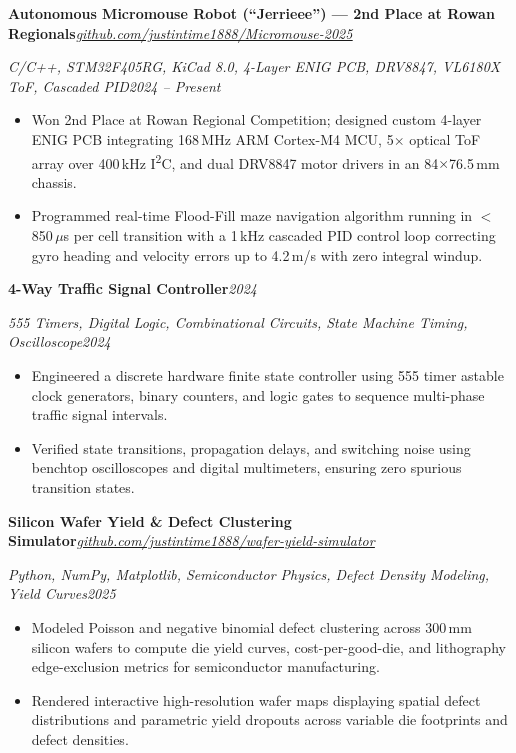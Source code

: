 \documentclass[10pt]{article}
\newcommand{\ulink}[2]{\href{#1}{\underline{#2}}}
\newcommand{\RoleDates}[2]{\noindent\textit{#1}\hfill\textit{#2}\par}
\newcommand{\ProjectHeading}[2]{\noindent\textbf{#1}\hfill\textit{#2}\par}
\begin{document}
\ProjectHeading{Autonomous Micromouse Robot (``Jerrieee'') --- 2nd Place at Rowan Regionals}{\ulink{https://github.com/justintime1888/Micromouse-2025}{github.com/justintime1888/Micromouse-2025}}
\RoleDates{C/C++, STM32F405RG, KiCad 8.0, 4-Layer ENIG PCB, DRV8847, VL6180X ToF, Cascaded PID}{2024 -- Present}
\begin{itemize}
  \item Won 2nd Place at Rowan Regional Competition; designed custom 4-layer ENIG PCB integrating 168\,MHz ARM Cortex-M4 MCU, 5$\times$ optical ToF array over 400\,kHz I\textsuperscript{2}C, and dual DRV8847 motor drivers in an 84$\times$76.5\,mm chassis.
  \item Programmed real-time Flood-Fill maze navigation algorithm running in $<$850\,$\mu$s per cell transition with a 1\,kHz cascaded PID control loop correcting gyro heading and velocity errors up to 4.2\,m/s with zero integral windup.
\end{itemize}

\vspace{3.5pt}
\ProjectHeading{4-Way Traffic Signal Controller}{2024}
\RoleDates{555 Timers, Digital Logic, Combinational Circuits, State Machine Timing, Oscilloscope}{2024}
\begin{itemize}
  \item Engineered a discrete hardware finite state controller using 555 timer astable clock generators, binary counters, and logic gates to sequence multi-phase traffic signal intervals.
  \item Verified state transitions, propagation delays, and switching noise using benchtop oscilloscopes and digital multimeters, ensuring zero spurious transition states.
\end{itemize}

\vspace{3.5pt}
\ProjectHeading{Silicon Wafer Yield \& Defect Clustering Simulator}{\ulink{https://github.com/justintime1888/wafer-yield-simulator}{github.com/justintime1888/wafer-yield-simulator}}
\RoleDates{Python, NumPy, Matplotlib, Semiconductor Physics, Defect Density Modeling, Yield Curves}{2025}
\begin{itemize}
  \item Modeled Poisson and negative binomial defect clustering across 300\,mm silicon wafers to compute die yield curves, cost-per-good-die, and lithography edge-exclusion metrics for semiconductor manufacturing.
  \item Rendered interactive high-resolution wafer maps displaying spatial defect distributions and parametric yield dropouts across variable die footprints and defect densities.
\end{itemize}
\end{document}
